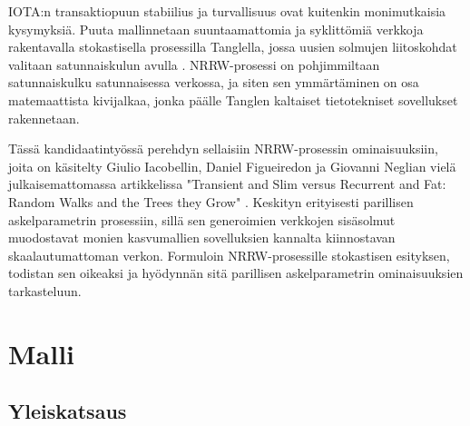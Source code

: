 \documentclass[finnish, 12pt, a4paper, sci, utf8, pdfa]{aaltothesis}
\begin{document}
IOTA:n transaktiopuun stabiilius ja turvallisuus ovat kuitenkin monimutkaisia kysymyksiä. Puuta mallinnetaan suuntaamattomia ja syklittömiä verkkoja rakentavalla stokastisella prosessilla 
Tanglella, jossa uusien solmujen liitoskohdat valitaan satunnaiskulun avulla \cite{Popov-tangle}. NRRW-prosessi on pohjimmiltaan satunnaiskulku satunnaisessa verkossa, ja siten 
sen ymmärtäminen on osa matemaattista kivijalkaa, jonka päälle Tanglen kaltaiset tietotekniset sovellukset rakennetaan.

Tässä kandidaatintyössä perehdyn sellaisiin NRRW-prosessin ominaisuuksiin, joita on käsitelty Giulio Iacobellin, Daniel Figueiredon ja Giovanni Neglian vielä julkaisemattomassa
artikkelissa "Transient and Slim versus Recurrent and Fat: Random Walks and the Trees they Grow" \cite{Iacobelli}. Keskityn erityisesti parillisen askelparametrin prosessiin, sillä 
sen generoimien verkkojen sisäsolmut muodostavat monien kasvumallien sovelluksien kannalta kiinnostavan skaalautumattoman verkon. Formuloin NRRW-prosessille stokastisen esityksen, 
todistan sen oikeaksi ja hyödynnän sitä parillisen askelparametrin ominaisuuksien tarkasteluun.

\clearpage

\section{Malli}

\subsection{Yleiskatsaus}
\end{document}
